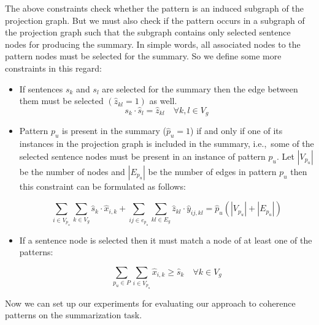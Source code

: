 The above constraints check whether the pattern is an induced subgraph of the projection graph. 
But we must also check if the pattern occurs in a subgraph of the projection graph such that the subgraph contains only selected sentence nodes for producing the summary. 
In simple words, all associated nodes to the pattern nodes must be selected for the summary. 
So we define some more constraints in this regard:

\begin{itemize}

\item If sentences $s_{k}$ and $s_{l}$ are selected for the summary then the edge between them must be selected $(\hat{z}_{kl}=1)$ as well.
\begin{equation}
	\label{eq:quadretic-const}
 s_{k} \cdot \hat{s}_{l}=\hat{z}_{kl} \quad \forall k,l \in V_{g}
\end{equation}

\item Pattern $p_u$ is present in the summary ($\hat{p}_u=1$) if and only if one of its instances in the projection graph is included in the summary, i.e.,\ some of the selected sentence nodes must be present in an instance of pattern $p_{u}$.
Let $|V_{p_{u}}|$ be the number of nodes and $|E_{p_u}|$ be the number of edges in pattern $p_{u}$ then this constraint can be formulated as follows:

\begin{equation}
\underset{i \in V_{p_u}}{\sum} \underset{k \in V_g}{\sum} \hat{s}_k \cdot \hat{x}_{i,k}+\underset{ij \in e_{p_u}}{\sum} \underset{kl \in E_g}{\sum} \hat{z}_{kl} \cdot \hat{y}_{ij,kl} = \hat{p}_{u}(|V_{p_u}|+|E_{p_u}|)
\end{equation}

\item If a sentence node is selected then it must match a node of at least one of the patterns:

\begin{equation}
\sum_{p_{u} \in P} \sum_{i \in V_{p_{u}}} \hat{x}_{i,k} \geq \hat{s}_{k} \quad \forall k \in V_{g}
 \end{equation}
\end{itemize}

Now we can set up our experiments for evaluating our approach to coherence patterns on the summarization task. 


